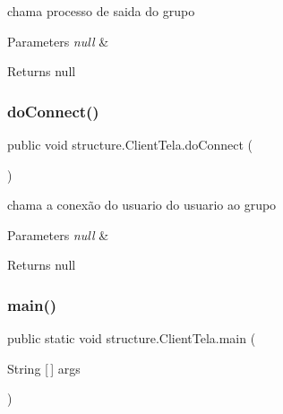 chama processo de saida do grupo 


\begin{DoxyParams}{Parameters}
{\em null} & \\
\hline
\end{DoxyParams}
\begin{DoxyReturn}{Returns}
null 
\end{DoxyReturn}
\mbox{\label{classstructure_1_1_client_tela_a60fdbdd395b62d73b5bdeac95237fcc0}} 
\subsubsection{\texorpdfstring{do\+Connect()}{doConnect()}}
{\footnotesize\ttfamily public void structure.\+Client\+Tela.\+do\+Connect (\begin{DoxyParamCaption}{ }\end{DoxyParamCaption})}



chama a conexão do usuario do usuario ao grupo 


\begin{DoxyParams}{Parameters}
{\em null} & \\
\hline
\end{DoxyParams}
\begin{DoxyReturn}{Returns}
null 
\end{DoxyReturn}
\mbox{\label{classstructure_1_1_client_tela_ab70271ebd978b7bf287b1f18d4febae7}} 
\subsubsection{\texorpdfstring{main()}{main()}}
{\footnotesize\ttfamily public static void structure.\+Client\+Tela.\+main (\begin{DoxyParamCaption}\item[{String \mbox{[}$\,$\mbox{]}}]{args }\end{DoxyParamCaption})\hspace{0.3cm}{\ttfamily [static]}}



